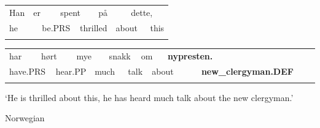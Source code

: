 \begin{tabular}{llllllllll}
\lsptoprule
Han & \multicolumn{2}{l}{er

} & \multicolumn{2}{l}{spent

} & \multicolumn{2}{l}{på

} & \multicolumn{2}{l}{dette,

} & \\
\multicolumn{2}{l}{he

} & \multicolumn{2}{l}{be.PRS

} & \multicolumn{2}{l}{thrilled

} & \multicolumn{2}{l}{about

} & \multicolumn{2}{l}{this

}\\
\lspbottomrule
\end{tabular}

\begin{tabular}{llllllllllllll}
\lsptoprule
har & \multicolumn{2}{l}{hørt

} & \multicolumn{2}{l}{mye

} & \multicolumn{2}{l}{snakk

} & \multicolumn{2}{l}{om

} & \multicolumn{2}{l}{{\bfseries nypresten.}

} & \multicolumn{2}{l}{} & \\
\multicolumn{2}{l}{have.PRS

} & \multicolumn{2}{l}{hear.PP

} & \multicolumn{2}{l}{much

} & \multicolumn{2}{l}{talk

} & \multicolumn{2}{l}{about 

} & \multicolumn{2}{l}{{\bfseries new\_clergyman.DEF}

} & \multicolumn{2}{l}{}\\
\lspbottomrule
\end{tabular}

\begin{styleTranslation}
‘He is thrilled about this, he has heard much talk about the new clergyman.’

\end{styleTranslation}

\begin{listWWNumileveli}
\item {}

\begin{styleExample}
Norwegian 

\end{styleExample}

\end{listWWNumileveli}

